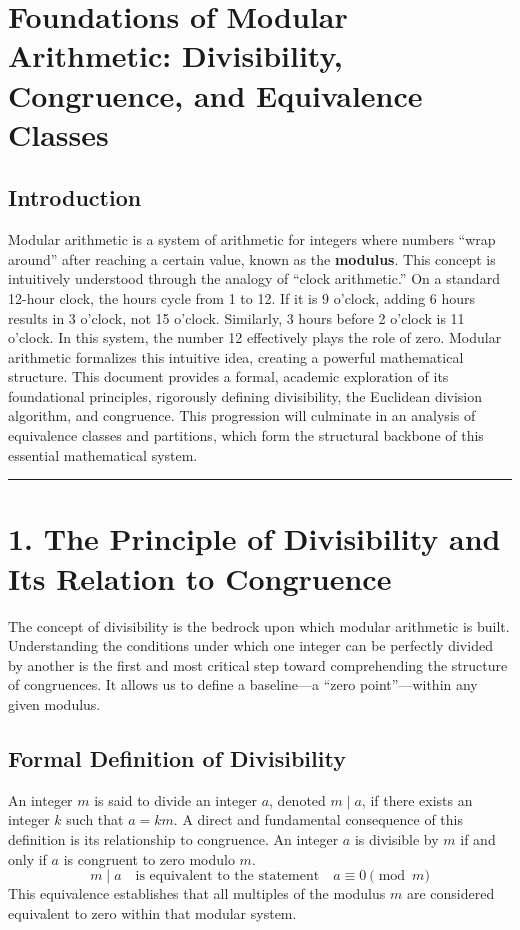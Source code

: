 \section*{Foundations of Modular Arithmetic: Divisibility, Congruence, and Equivalence Classes}

\subsection*{Introduction}
Modular arithmetic is a system of arithmetic for integers where numbers ``wrap around'' after reaching a certain value, known as the \textbf{modulus}. This concept is intuitively understood through the analogy of ``clock arithmetic.'' On a standard 12-hour clock, the hours cycle from 1 to 12. If it is 9 o'clock, adding 6 hours results in 3 o'clock, not 15 o'clock. Similarly, 3 hours before 2 o'clock is 11 o'clock. In this system, the number 12 effectively plays the role of zero. Modular arithmetic formalizes this intuitive idea, creating a powerful mathematical structure. This document provides a formal, academic exploration of its foundational principles, rigorously defining divisibility, the Euclidean division algorithm, and congruence. This progression will culminate in an analysis of equivalence classes and partitions, which form the structural backbone of this essential mathematical system.

\hrule

\section*{1. The Principle of Divisibility and Its Relation to Congruence}
The concept of divisibility is the bedrock upon which modular arithmetic is built. Understanding the conditions under which one integer can be perfectly divided by another is the first and most critical step toward comprehending the structure of congruences. It allows us to define a baseline---a ``zero point''---within any given modulus.

\subsection*{Formal Definition of Divisibility}
An integer $m$ is said to divide an integer $a$, denoted $m \mid a$, if there exists an integer $k$ such that $a = km$.
A direct and fundamental consequence of this definition is its relationship to congruence. An integer $a$ is divisible by $m$ if and only if $a$ is congruent to zero modulo $m$.
$$ m \mid a \quad \text{is equivalent to the statement} \quad a \equiv 0 \pmod{m} $$
This equivalence establishes that all multiples of the modulus $m$ are considered equivalent to zero within that modular system.

